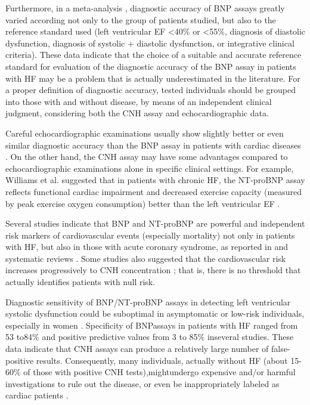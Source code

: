 \documentclass[14pt,a4paper,onecolumn]{extarticle}
\begin{document}
Furthermore, in a meta-analysis \citep{bib372}, diagnostic accuracy of BNP assays greatly varied according not only to the group of patients studied, but also to the reference standard used (left ventricular EF <40\% or <55\%, diagnosis of diastolic dysfunction, diagnosis of systolic + diastolic dysfunction, or integrative clinical criteria). These data indicate that the choice of a suitable and accurate reference standard for evaluation of the diagnostic accuracy of the BNP assay in patients with HF may be a problem that is actually underestimated in the literature. For a proper definition of diagnostic accuracy, tested individuals should be grouped into those with and without disease, by means of an independent clinical judgment, considering both the CNH assay and echocardiographic data.

Careful echocardiographic examinations usually show slightly better or even similar diagnostic accuracy than the BNP assay in patients with cardiac diseases \citep{bib373} \citep{bib374}. On the other hand, the CNH assay may have some advantages compared to echocardiographic examinations alone in specific clinical settings. For example, Williams et al. suggested that in patients with chronic HF, the NT-proBNP assay reflects functional cardiac impairment and decreased exercise capacity (measured by peak exercise oxygen consumption) better than the left ventricular EF \citep{bib375}.

Several studies indicate that BNP and NT-proBNP are powerful and independent risk markers of cardiovascular events (especially mortality) not only in patients with HF, but also in those with acute coronary syndrome, as reported in  and systematic reviews \citep{bib35} \citep{bib376} \citep{bib377} \citep{bib378}. Some studies also suggested that the cardiovascular risk increases progressively to CNH concentration \citep{bib377} \citep{bib378} \citep{bib379}; that is, there is no threshold that actually identifies patients with null risk.


Diagnostic sensitivity of BNP/NT-proBNP assays in detecting left ventricular systolic dysfunction could be suboptimal in asymptomatic or low-risk individuals, especially in women \citep{bib39}. Specificity of BNPassays in patients with HF ranged from 53 to84\% and positive predictive values from 3 to 85\% inseveral studies. These data indicate that CNH assays can produce a relatively large number of false-positive results. Consequently, many individuals, actually without HF (about 15-60\% of those with positive CNH tests),mightundergo expensive and/or harmful investigations to rule out the disease, or even be inappropriately labeled as cardiac patients \citep{bib35}.
\end{document}
